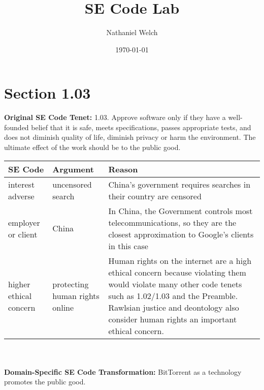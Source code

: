 \documentclass[]{article}
\title{SE Code Lab}
\author{Nathaniel Welch}
\date{\today}
\begin{document}
\maketitle

\section{Section 1.03}

\textbf{Original SE Code Tenet:}
1.03. Approve software only if they have a well-founded belief that it is safe, meets specifications, passes appropriate tests, and does not diminish quality of life, diminish privacy or harm the environment. The ultimate effect of the work should be to the public good.
\newline

\begin{tabular}{|p{100pt}|p{100pt}|p{220pt}|}
\hline
SE Code & Argument & Reason\\
\hline
interest adverse & uncensored search & China's government requires searches in their country are censored\\
\hline
employer or client & China & In China, the Government controls most telecommunications, so they are the closest approximation to Google's clients in this case\\
\hline
higher ethical concern & protecting human rights online & Human rights on the internet are a high ethical concern because violating them would violate many other code tenets such as 1.02/1.03 and the Preamble. Rawlsian justice and deontology also consider human rights an important ethical concern.\\
\hline
\end{tabular}\\
\newline\\
\textbf{Domain-Specific SE Code Transformation:}
BitTorrent as a technology promotes the public good.



\end{document}
